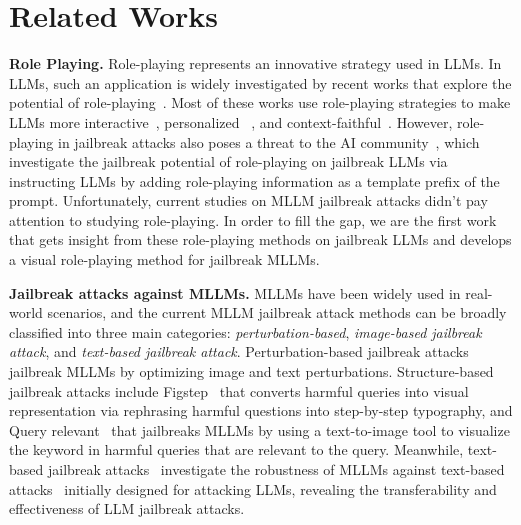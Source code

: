     

\section{Related Works}
\textbf{Role Playing.} Role-playing represents an innovative strategy used in LLMs. In LLMs, such an application is widely investigated by recent works that explore the potential of role-playing~\cite{lu2024llm, shanahan2023roleplay, zhou-etal-2023-context, wang2024rolellm, wei2023multiparty, salemi2024lamp, chen2024autoagents, tao2024rolecraftglm}. Most of these works use role-playing strategies to make LLMs more interactive~\cite{wei2023multiparty}, personalized ~\cite{shanahan2023roleplay, wang2024rolellm, tao2024rolecraftglm}, and context-faithful~\cite{zhou-etal-2023-context}. However, role-playing in jailbreak attacks also poses a threat to the AI community~\cite{liu2024autodan, shen2023do, jin2024quack}, which investigate the jailbreak potential of role-playing on jailbreak LLMs via instructing LLMs by adding role-playing information as a template prefix of the prompt. Unfortunately, current studies on MLLM jailbreak attacks didn’t pay attention to studying role-playing. In order to fill the gap, we are the first work that gets insight from these role-playing methods on jailbreak LLMs and develops a visual role-playing method for jailbreak MLLMs.  

\textbf{Jailbreak attacks against MLLMs.} MLLMs have been widely used in real-world scenarios, and the current MLLM jailbreak attack methods can be broadly classified into three main categories: \textit{perturbation-based}, \textit{image-based jailbreak attack}, and \textit{text-based jailbreak attack}. Perturbation-based jailbreak attacks~\cite{shayegani2024jailbreak, niu2024jailbreaking, qi2023visual, dong2023robust} jailbreak MLLMs by optimizing image and text perturbations. Structure-based jailbreak attacks include Figstep~\cite{gong2023figstep} that converts harmful queries into visual representation via rephrasing harmful questions into step-by-step typography, and Query relevant~\cite{liu2024mmsafetybench} that jailbreaks MLLMs by using a text-to-image tool to visualize the keyword in harmful queries that are relevant to the query. Meanwhile, text-based jailbreak attacks~\cite{luo2024jailbreakv28k} investigate the robustness of MLLMs against text-based attacks~\cite{zou2023universal, zeng2024johnny, shen2023do, xu2024cognitive} initially designed for attacking LLMs, revealing the transferability and effectiveness of LLM jailbreak attacks.

